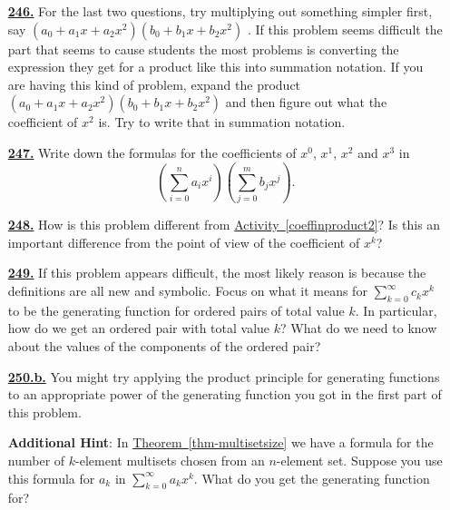 \documentclass[10pt,]{book}
\theoremstyle{plain}
\theoremstyle{definition}
\theoremstyle{definition}
\theoremstyle{definition}
\numberwithin{equation}{chapter}
\begin{document}
\begin{itemize}[itemsep=1em]
\hypertarget{a-246}{}\item[\textbf{\hyperref[coeffinproduct1]{246.}}]
\hypertarget{p-1290}{}%
For the last two questions, try multiplying out something simpler first, say \((a_0 + a_1 x + a_2 x^2 )(b_0 + b_1 x + b_2 x^2 )\) . If this problem seems difficult the part that seems to cause students the most problems is converting the expression they get for a product like this into summation notation. If you are having this kind of problem, expand the product \((a_0 + a_1 x + a_2 x^2 )(b_0 + b_1 x + b_2 x^2 )\) and then figure out what the coefficient of \(x^2\) is. Try to write that in summation notation.%

\hypertarget{a-247}{}\item[\textbf{\hyperref[coeffinproduct2]{247.}}]
\hypertarget{p-1294}{}%
Write down the formulas for the coefficients of \(x^0\), \(x^1\), \(x^2\) and \(x^3\) in%
\begin{equation*}
\left(\sum_{i=0}^n a_ix^i\right)\left(\sum_{j=0}^m b_jx^j\right)\text{.}
\end{equation*}
%

\hypertarget{a-248}{}\item[\textbf{\hyperref[coeffinpowerseries]{248.}}]
\hypertarget{p-1297}{}%
How is this problem different from \hyperref[coeffinproduct2]{Activity~\ref{coeffinproduct2}}? Is this an important difference from the point of view of the coefficient of \(x^k\)?%

\hypertarget{a-249}{}\item[\textbf{\hyperref[ProductPrincipleOGF]{249.}}]
\hypertarget{p-1302}{}%
If this problem appears difficult, the most likely reason is because the definitions are all new and symbolic. Focus on what it means for \(\sum_{k=0}^\infty c_kx^k\) to be the generating function for ordered pairs of total value \(k\). In particular, how do we get an ordered pair with total value \(k\)? What do we need to know about the values of the components of the ordered pair?%

\hypertarget{a-250.b}{}\item[\textbf{\hyperref[task-245]{250.b.}}]
\hypertarget{p-1311}{}%
You might try applying the product principle for generating functions to an appropriate power of the generating function you got in the first part of this problem.%

\par\smallskip
\noindent\textbf{Additional Hint}: \hypertarget{p-1312}{}%
In \hyperref[thm-multisetsize]{Theorem~\ref{thm-multisetsize}} we have a formula for the number of \(k\)-element multisets chosen from an \(n\)-element set. Suppose you use this formula for \(a_k\) in \(\sum_{k=0}^\infty a_kx^k\). What do you get the generating function for?%


\end{itemize}
\end{document}
